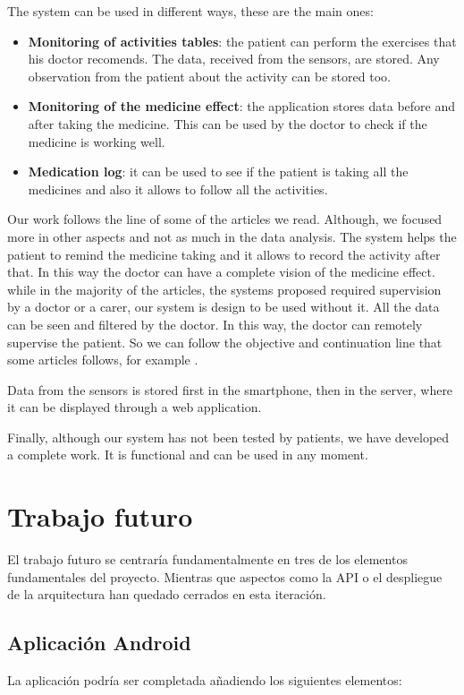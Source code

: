 \documentclass[11pt,spanish]{article}
\begin{document}
The system can be used in different ways, these are the main ones:

\begin{itemize}
	\item {\bf Monitoring of activities tables}: the patient can perform the exercises that his doctor recomends. The data, received from the sensors, are stored. Any observation from the patient about the activity can be stored too.
	\item {\bf Monitoring of the medicine effect}: the application stores data before and after taking the medicine. This can be used by the doctor to check if the medicine is working well.
	\item {\bf Medication log}: it can be used to see if the patient is taking all the medicines and also it allows to follow all the activities. 
\end{itemize}

Our work follows the line of some of the articles we read. Although, we focused more in other aspects and not as much in the data analysis. The system helps the patient to remind the medicine taking and it allows to record the activity after that. In this way the doctor can have a complete vision of the medicine effect. while in the majority of the articles, the systems proposed required supervision by a doctor or a carer, our system is design to be used without it. All the data can be seen and filtered by the doctor. In this way, the doctor can remotely supervise the patient. So we can follow the objective and continuation line that some articles follows, for example \cite {resumen2}.
\newline

Data from the sensors is stored first in the smartphone, then in the server, where it can be displayed through a web application.
\newline

Finally, although our system has not been tested by patients, we have developed a complete work. It is functional and can be used in any moment.
\newpage

\section{Trabajo futuro}
El trabajo futuro se centraría fundamentalmente en tres de los elementos fundamentales del proyecto. Mientras que aspectos como la API o el despliegue de la arquitectura han quedado cerrados en esta iteración.

\subsection{Aplicación Android}
La aplicación podría ser completada añadiendo los siguientes elementos:
\end{document}
